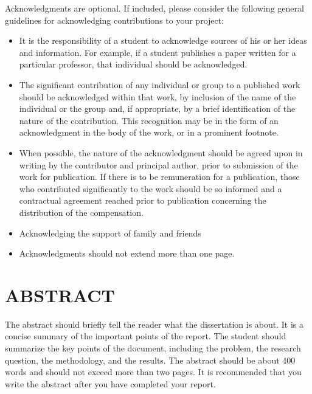 \documentclass[12pt,openany]{book}
\begin{document}
Acknowledgments are optional. If included, please consider the following general guidelines for acknowledging contributions to your project:

\begin{itemize}
\item It is the responsibility of a student to acknowledge sources of his or her ideas and information. For example, if a student publishes a paper written for a particular professor, that individual should be acknowledged.

\item The significant contribution of any individual or group to a published work should be acknowledged within that work, by inclusion of the name of the individual or the group and, if appropriate, by a brief identification of the nature of the contribution. This recognition may be in the form of an acknowledgment in the body of the work, or in a prominent footnote. 

\item When possible, the nature of the acknowledgment should be agreed upon in writing by the contributor and principal author, prior to submission of the work for publication. If there is to be remuneration for a publication, those who contributed significantly to the work should be so informed and a contractual agreement reached prior to publication concerning the distribution of the compensation.

\item Acknowledging the support of family and friends

\item Acknowledgments should not extend more than one page.

\end{itemize}

\chapter*{ABSTRACT}

The abstract should briefly tell the reader what the dissertation is about. It is a concise summary of the important points of the report.  The student should summarize the key points of the document, including the problem, the research question, the methodology, and the results.  The abstract should be about 400 words and should not exceed more than two pages.  It is recommended that you write the abstract after you have completed your report.
\end{document}
